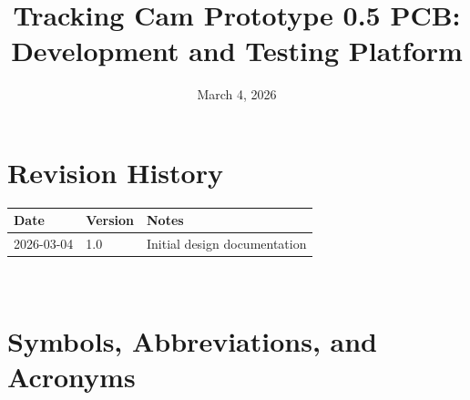 \documentclass[12pt, titlepage]{article}
\begin{document}
\title{Tracking Cam Prototype 0.5 PCB: Development and Testing Platform}
\author{\authname}
\date{March 4, 2026}

\maketitle


\section*{Revision History}

\begin{tabularx}{\textwidth}{p{3cm}p{2cm}X}
  \toprule {\bf Date} & {\bf Version} & {\bf Notes}                  \\
  \midrule
  2026-03-04          & 1.0           & Initial design documentation \\
  \bottomrule
\end{tabularx}

~\\

\newpage

\tableofcontents

\newpage

\section{Symbols, Abbreviations, and Acronyms}
\end{document}
